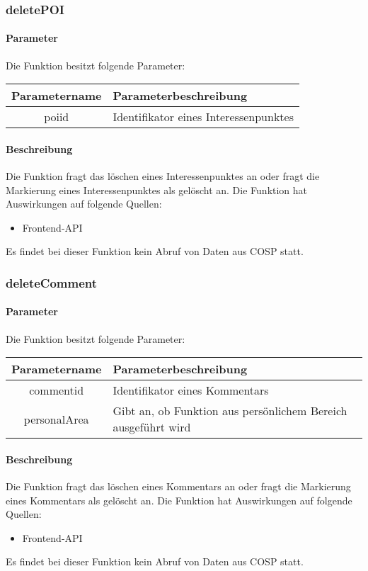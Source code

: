 \subsubsection{deletePOI}
\paragraph{Parameter} Die Funktion besitzt folgende Parameter:
\begin{table}[H]
	\begin{tabular}{|c|p{11cm}|}
		\hline
		\textbf{Parametername} & \textbf{Parameterbeschreibung} \\ \hline
		poiid & Identifikator eines Interessenpunktes \\ \hline
	\end{tabular}
\end{table}
\paragraph{Beschreibung} Die Funktion fragt das löschen eines Interessenpunktes an oder fragt die Markierung eines Interessenpunktes als gelöscht an. Die Funktion hat Auswirkungen auf folgende Quellen:
\begin{itemize}
	\item Frontend-API
\end{itemize}
Es findet bei dieser Funktion kein Abruf von Daten aus {\glqq COSP\grqq} statt.
\subsubsection{deleteComment}
\paragraph{Parameter} Die Funktion besitzt folgende Parameter:
\begin{table}[H]
	\begin{tabular}{|c|p{11cm}|}
		\hline
		\textbf{Parametername} & \textbf{Parameterbeschreibung} \\ \hline
		commentid    & Identifikator eines Kommentars \\ \hline
		personalArea & Gibt an, ob Funktion aus persönlichem Bereich ausgeführt wird \\ \hline
	\end{tabular}
\end{table}
\paragraph{Beschreibung} Die Funktion fragt das löschen eines Kommentars an oder fragt die Markierung eines Kommentars als gelöscht an. Die Funktion hat Auswirkungen auf folgende Quellen:
\begin{itemize}
	\item Frontend-API
\end{itemize}
Es findet bei dieser Funktion kein Abruf von Daten aus {\glqq COSP\grqq} statt.
